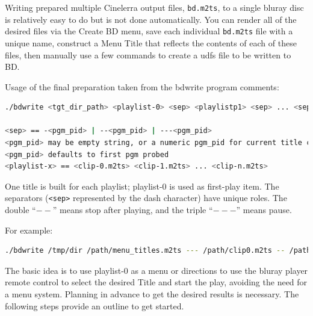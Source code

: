 Writing prepared multiple Cinelerra output files, \texttt{bd.m2ts}, to a single bluray disc is relatively easy to do but is not done automatically.  You can render all of the desired files via the Create BD menu, save each individual \texttt{bd.m2ts} file with a unique name, construct a Menu Title that reflects the contents of each of these files, then manually use a few commands to create a udfs file to be written to BD.

Usage of the final preparation taken from the bdwrite program comments:

\begin{lstlisting}[language=bash,numbers=none]
./bdwrite <tgt_dir_path> <playlist-0> <sep> <playlistp1> <sep> ... <sep> <playlist-n>

<sep> == -<pgm_pid> | --<pgm_pid> | ---<pgm_pid>
<pgm_pid> may be empty string, or a numeric pgm_pid for current title clip
<pgm_pid> defaults to first pgm probed
<playlist-x> == <clip-0.m2ts> <clip-1.m2ts> ... <clip-n.m2ts>
\end{lstlisting}

One title is built for each playlist; playlist-0 is used as first-play item.  The separators (\texttt{<sep>} represented by the dash character) have unique roles.  The double “$--$” means stop after playing, and the triple “$---$” means pause.

For example:

\begin{lstlisting}[language=bash,numbers=none]
./bdwrite /tmp/dir /path/menu_titles.m2ts --- /path/clip0.m2ts -- /path/clip1.m2ts -- /path/clip2.m2ts
\end{lstlisting}

The basic idea is to use playlist-0 as a menu or directions to use the bluray player remote control to select the desired Title and start the play, avoiding the need for a menu system.  Planning in advance to get the desired results is necessary.  The following steps provide an outline to get started.

